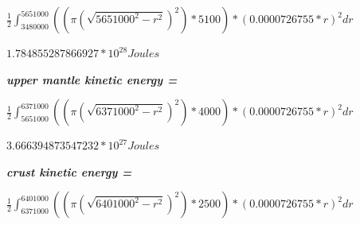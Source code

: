 \documentclass[a4paper, 11pt, oneside]{book} %
\begin{document}
\vspace{0.5\baselineskip} %
\vspace{0.5\baselineskip} %

$\frac{1}{2} \int_{3480000}^{5651000} ((\pi(\sqrt{5651000^2-r^2})^2) * 5100) * (0.0000726755 * r)^2 dr$\\

\vspace{0.5\baselineskip} %
\vspace{0.5\baselineskip} %

$1.784855287866927*10^{28} Joules$

\vspace{0.5\baselineskip} %
\vspace{0.5\baselineskip} %
\textbf{\textit{upper mantle kinetic energy = }}\\

\vspace{0.5\baselineskip} %
\vspace{0.5\baselineskip} %

$\frac{1}{2} \int_{5651000}^{6371000} ((\pi(\sqrt{6371000^2-r^2})^2) * 4000) * (0.0000726755 * r)^2 dr$\\

\vspace{0.5\baselineskip} %
\vspace{0.5\baselineskip} %

$3.666394873547232*10^{27} Joules$

\vspace{0.5\baselineskip} %
\vspace{0.5\baselineskip} %
\textbf{\textit{crust kinetic energy = }}\\

\vspace{0.5\baselineskip} %
\vspace{0.5\baselineskip} %

$\frac{1}{2} \int_{6371000}^{6401000} ((\pi(\sqrt{6401000^2-r^2})^2) * 2500) * (0.0000726755 * r)^2 dr$\\
\end{document}

